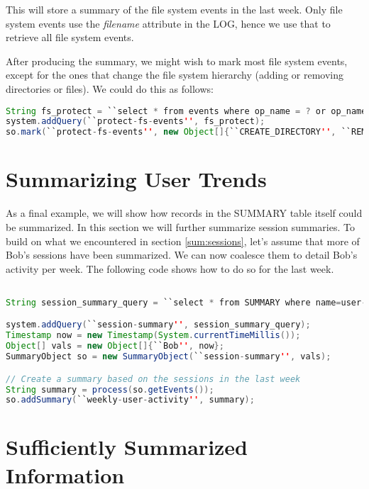 \noindent
This will store a summary of the file system events in the last week. Only file system events use the \emph{filename} attribute in the LOG, hence we use that to retrieve all file system events.

After producing the summary, we might wish to mark most file system events, except for the ones that change the file system hierarchy (adding or removing directories or files). We could do this as follows:

\begin{lstlisting}[language=Java]
String fs_protect = ``select * from events where op_name = ? or op_name = ?''
system.addQuery(``protect-fs-events'', fs_protect);
so.mark(``protect-fs-events'', new Object[]{``CREATE_DIRECTORY'', ``REMOVE_DIRECTORY'', ``CREATE_FILE, ``REMOVE_FILE''});
\end{lstlisting}

\section{Summarizing User Trends}

As a final example, we will show how records in the SUMMARY table itself could be summarized. In this section we will further summarize session summaries. To build on what we encountered in section \ref{sum:sessions}, let's assume that more of Bob's sessions have been summarized. We can now coalesce them to detail Bob's activity per week. The following code shows how to do so for the last week.

\begin{lstlisting}[language=Java]

String session_summary_query = ``select * from SUMMARY where name=user-session-summary and to_array(args)[0]=? to_array(args)[3]::timestamp > DATE_SUB(?, INTERVAL 7 DAY) and to_array(args)[3]::timestamp < DATE_SUB(?, INTERVAL 14 DAY)';

system.addQuery(``session-summary'', session_summary_query);
Timestamp now = new Timestamp(System.currentTimeMillis());
Object[] vals = new Object[]{``Bob'', now};
SummaryObject so = new SummaryObject(``session-summary'', vals);

// Create a summary based on the sessions in the last week
String summary = process(so.getEvents());
so.addSummary(``weekly-user-activity'', summary);
\end{lstlisting}


\section{Sufficiently Summarized Information}

